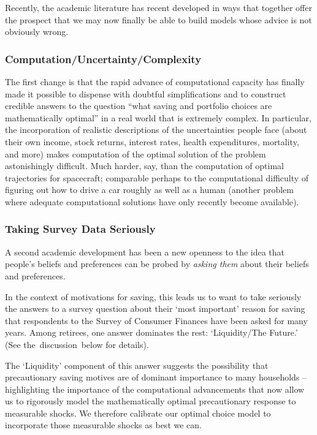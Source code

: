\documentclass{article}
\begin{document}
Recently, the academic literature has recent developed in ways that together offer the prospect that we may now finally be able to build models whose advice is not obviously wrong.


\subsubsection{Computation/Uncertainty/Complexity}

The first change is that the rapid advance of computational capacity has finally made it possible to dispense with doubtful simplifications and to construct credible answers to the question ``what saving and portfolio choices are mathematically optimal'' in a real world that is extremely complex. In particular, the incorporation of realistic descriptions of the uncertainties people face (about their own income, stock returns, interest rates, health expenditures, mortality, and more) makes computation of the optimal solution of the problem astonishingly difficult. Much harder, say, than the computation of optimal trajectories for spacecraft; comparable perhaps to the computational difficulty of figuring out how to drive a car roughly as well as a human (another problem where adequate computational solutions have only recently become available).


\subsubsection{Taking Survey Data Seriously}

A second academic development has been a new openness to the idea that people's beliefs and preferences can be probed by \textit{asking them} about their beliefs and preferences.

In the context of motivations for saving, this leads us to want to take seriously the answers to a survey question about their `most important' reason for saving that respondents to the Survey of Consumer Finances have been asked for many years. Among retirees, one answer dominates the rest: `Liquidity/The Future.'  (See the~discussion~below for details).

The `Liquidity' component of this answer suggests the possibility that precautionary saving motives are of dominant importance to many households -- highlighting the importance of the computational advancements that now allow us to rigorously model the mathematically optimal precautionary response to measurable shocks. We therefore calibrate our optimal choice model to incorporate those measurable shocks as best we can.
\end{document}
